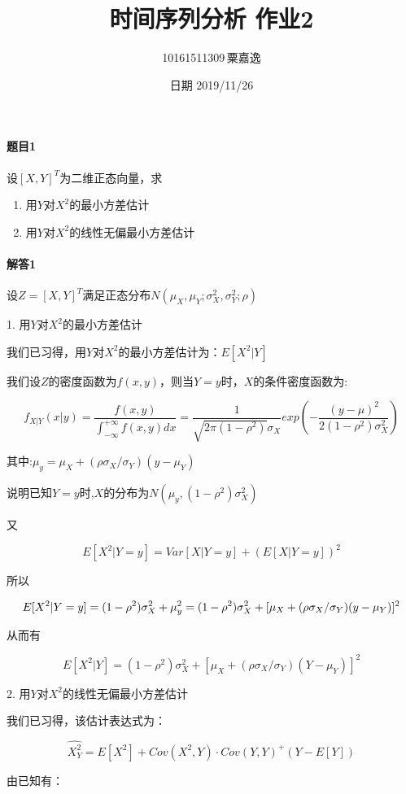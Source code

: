 \documentclass[12pt, a4paper]{ctexart}
\title{时间序列分析 作业2}
\author{10161511309\,粟嘉逸}
\date{日期 2019/11/26}
\begin{document}
\maketitle{}

\paragraph{题目1}
设$[X,Y]^T$为二维正态向量，求
        \begin{enumerate}
        \item 用$Y$对$X^2$的最小方差估计
        \item 用$Y$对$X^2$的线性无偏最小方差估计
        \end{enumerate}	
\paragraph{解答1}

设$Z=[X,Y]^T$满足正态分布$N(\mu_X,\mu_Y;\sigma_X^2,\sigma_Y^2;\rho)$

1. 用$Y$对$X^2$的最小方差估计

我们已习得，用$Y$对$X^2$的最小方差估计为：$E[X^2|Y]$

我们设$Z$的密度函数为$f(x,y)$，则当$Y=y$时，$X$的条件密度函数为:

\[
    f_{X|Y}(x|y)=\dfrac{f(x,y)}{\int_{-\infty}^{+\infty}f(x,y)dx}
    =\dfrac{1}{\sqrt{2\pi(1-\rho^2)}\sigma_X}exp(-\dfrac{(y-\mu)^2}{2(1-\rho^2)\sigma_X^2})
\]

其中:$\mu_y=\mu_X+(\rho\sigma_X/\sigma_Y)(y-\mu_Y)$

说明已知$Y=y$时,$X$的分布为$N(\mu_y,(1-\rho^2)\sigma_X^2)$

又

\[
    E[X^2|Y=y] = Var[X|Y=y] + (E[X|Y=y])^2
\]

所以

$$
    E[X^2|Y=y] = (1-\rho^2)\sigma_X^2 + \mu_y^2 \\
               = (1-\rho^2)\sigma_X^2 + [\mu_X+(\rho\sigma_X/\sigma_Y)(y-\mu_Y)]^2
$$

从而有

\[
    E[X^2|Y] = (1-\rho^2)\sigma_X^2 + [\mu_X+(\rho\sigma_X/\sigma_Y)(Y-\mu_Y)]^2
\]

2. 用$Y$对$X^2$的线性无偏最小方差估计

我们已习得，该估计表达式为：

\[
    \hat{X^2_Y} = E[X^2] + Cov(X^2,Y)\cdot Cov(Y,Y)^+ (Y-E[Y])
\]

由已知有：
\end{document}
